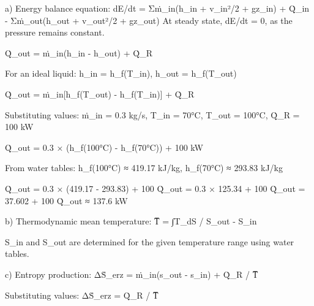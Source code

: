 a)  
Energy balance equation:  
dE/dt = Σṁ_in(h_in + v_in²/2 + gz_in) + Q̇_in - Σṁ_out(h_out + v_out²/2 + gz_out)  
At steady state, dE/dt = 0, as the pressure remains constant.  

Q̇_out = ṁ_in(h_in - h_out) + Q̇_R  

For an ideal liquid:  
h_in = h_f(T_in), h_out = h_f(T_out)  

Q̇_out = ṁ_in[h_f(T_out) - h_f(T_in)] + Q̇_R  

Substituting values:  
ṁ_in = 0.3 kg/s, T_in = 70°C, T_out = 100°C, Q̇_R = 100 kW  

Q̇_out = 0.3 × (h_f(100°C) - h_f(70°C)) + 100 kW  

From water tables:  
h_f(100°C) ≈ 419.17 kJ/kg, h_f(70°C) ≈ 293.83 kJ/kg  

Q̇_out = 0.3 × (419.17 - 293.83) + 100  
Q̇_out = 0.3 × 125.34 + 100  
Q̇_out = 37.602 + 100  
Q̇_out ≈ 137.6 kW  

b)  
Thermodynamic mean temperature:  
T̅ = ∫T_dS / S_out - S_in  

S_in and S_out are determined for the given temperature range using water tables.  

c)  
Entropy production:  
ΔṠ_erz = ṁ_in(s_out - s_in) + Q̇_R / T̅  

Substituting values:  
ΔṠ_erz = Q̇_R / T̅